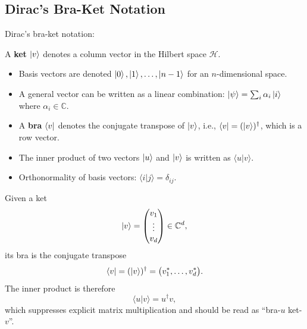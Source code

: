 \subsection{Dirac's Bra-Ket Notation}

Dirac's bra-ket notation:
\begin{definition}
A \textbf{ket} $\ket{v}$ denotes a column vector in the Hilbert space $\mathcal{H}$.
\begin{itemize}
\item Basis vectors are denoted $\ket{0}, \ket{1}, \ldots, \ket{n-1}$ for an $n$-dimensional space.
\item A general vector can be written as a linear combination: $\ket{\psi} = \sum_{i} \alpha_i \ket{i}$ where $\alpha_i \in \mathbb{C}$.
\item A \textbf{bra} $\bra{v}$ denotes the conjugate transpose of $\ket{v}$, i.e., $\bra{v} = (\ket{v})^\dagger$, which is a row vector.
\item The inner product of two vectors $\ket{u}$ and $\ket{v}$ is written as $\langle u|v \rangle$.
\item Orthonormality of basis vectors: $\langle i|j \rangle = \delta_{ij}$.
\end{itemize}
\end{definition}

\begin{remark}
Given a ket
\[
\ket{v} = \begin{pmatrix} v_1 \\ \vdots \\ v_d \end{pmatrix} \in \mathbb{C}^d,
\]
its bra is the conjugate transpose
\[
\bra{v} = (\ket{v})^\dagger = \big(v_1^*, \ldots, v_d^*\big).
\]
The inner product is therefore
\[
\langle u|v \rangle = u^\dagger v,
\]
which suppresses explicit matrix multiplication and should be read as ``bra-$u$ ket-$v$''.
\end{remark}

